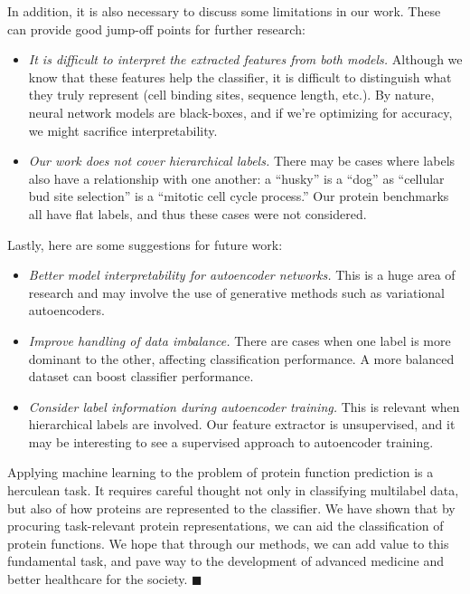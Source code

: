 \par In addition, it is also necessary to discuss some limitations in our work.
These can provide good jump-off points for further research:
\begin{itemize}
    \item \textit{It is difficult to interpret the extracted features from both
        models.} Although we know that these features help the classifier, it
        is difficult to distinguish what they truly represent (cell binding
        sites, sequence length, etc.). By nature, neural network models are
        black-boxes, and if we're optimizing for accuracy, we might sacrifice
        interpretability.
    \item \textit{Our work does not cover hierarchical labels.} There may be
        cases where labels also have a relationship with one another: a
        ``husky'' is a ``dog'' as ``cellular bud site selection'' is a
        ``mitotic cell cycle process.'' Our protein benchmarks all have flat
        labels, and thus these cases were not considered. 
\end{itemize}

\par Lastly, here are some suggestions for future work:
\begin{itemize}
    \item \textit{Better model interpretability for autoencoder networks.} This
        is a huge area of research and may involve the use of generative
        methods such as variational autoencoders.
    \item \textit{Improve handling of data imbalance.} There are cases when one
        label is more dominant to the other, affecting classification
        performance. A more balanced dataset can boost classifier performance.
    \item \textit{Consider label information during autoencoder training.} This
        is relevant when hierarchical labels are involved. Our feature
        extractor is unsupervised, and it may be interesting to see a
        supervised approach to autoencoder training.
\end{itemize}

\par Applying machine learning to the problem of protein function prediction is
a herculean task. It requires careful thought not only in classifying
multilabel data, but also of how proteins are represented to the classifier.
We have shown that by procuring task-relevant protein representations, we can
aid the classification of protein functions. We hope that through our methods,
we can add value to this fundamental task, and pave way to the development of
advanced medicine and better healthcare for the society. $\blacksquare$

